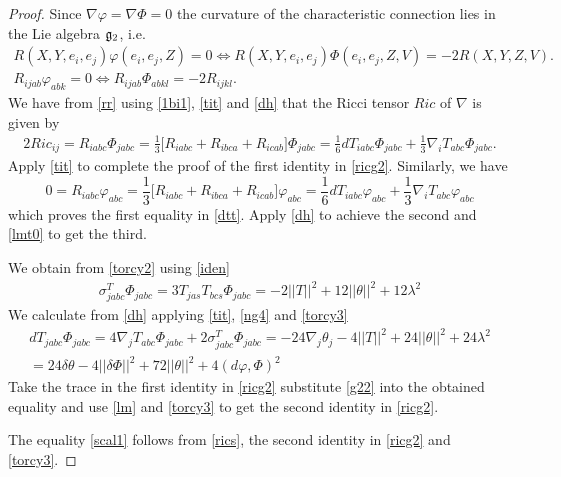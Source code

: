 \documentclass[10pt,british]{article}
\def\sb {{\nabla}}
\def\p{{\varphi}}
\def\ph{{\Phi}}
\begin{document}
\begin{proof}
 Since $\sb\p=\sb\ph=0$ the curvature of the characteristic connection lies in the Lie algebra $\frak{g}_2$, i.e. %
\begin{equation}\label{rr}
\begin{split}
R(X,Y,e_i,e_j)\p(e_i,e_j,Z)=0 \Longleftrightarrow R(X,Y,e_i,e_j)\ph(e_i,e_j,Z,V)=-2R(X,Y,Z,V).\\
R_{ijab}\p_{abk}=0 \Longleftrightarrow R_{ijab}\ph_{abkl}=-2R_{ijkl}.
\end{split}
\end{equation}
We have from \eqref{rr} using \eqref{1bi1}, \eqref{tit} and \eqref{dh}  that the Ricci tensor $Ric$ of  $\sb$ is given by
\begin{multline}\label{ricdt}
2Ric_{ij}=R_{iabc}\ph_{jabc}=\frac13\big[R_{iabc}+R_{ibca}+R_{icab} \big]\ph_{jabc}=\frac16dT_{iabc}\ph_{jabc}+\frac13\sb_iT_{abc}\ph_{jabc}.%
\end{multline}
Apply \eqref{tit} to complete the proof of the first identity in \eqref{ricg2}.
Similarly, we have
\[0=R_{iabc}\p_{abc}=\frac13\big[R_{iabc}+R_{ibca}+R_{icab} \big]\p_{abc}=\frac16dT_{iabc}\p_{abc}+\frac13\sb_iT_{abc}\p_{abc}\]
which proves the first equality in \eqref{dtt}. Apply \eqref{dh} to achieve the second and \eqref{lmt0} to get the third.

We obtain  from \eqref{torcy2} using \eqref{iden} 
\begin{equation}\label{ng4}
\begin{split}
\sigma^T_{jabc}\ph_{jabc}=3T_{jas}T_{bcs}\ph_{jabc}=-2||T||^2+12||\theta||^2+12\lambda^2
\end{split}
\end{equation}
We calculate from \eqref{dh} applying \eqref{tit}, \eqref{ng4} and \eqref{torcy3}
\begin{equation}\label{g22}
\begin{split}
dT_{jabc}\ph_{jabc}=4\sb_jT_{abc}\ph_{jabc}+2\sigma^T_{jabc}\ph_{jabc}=-24\sb_j\theta_j-4||T||^2+24||\theta||^2+24\lambda^2\\
=24\delta\theta -4||\delta\ph||^2+72||\theta||^2+4(d\p,\ph)^2
\end{split}
\end{equation}
Take the trace in the first identity in \eqref{ricg2} substitute  \eqref{g22} into the obtained equality and use \eqref{lm} and \eqref{torcy3} to get the second identity in \eqref{ricg2}. 

The equality  \eqref{scal1} follows from \eqref{rics}, the second identity in \eqref{ricg2} and \eqref{torcy3}.
\end{proof}
\end{document}
